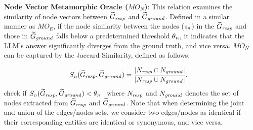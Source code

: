 

   
\textbf{Node Vector Metamorphic Oracle ($MO_N$)}: This relation examines the similarity of node vectors between $\widetilde{G}_{\mathit{resp}}$ and $\widetilde{G}_{\mathit{ground}}$. 
Defined in a similar manner as $MO_E$, if the node similarity between the nodes ($\mathit{s}_{\mathit{n}}$) in the $\widetilde{G}_{\mathit{resp}}$ and those in $\widetilde{G}_{\mathit{ground}}$ falls below a predetermined threshold $\theta_{\mathit{n}}$, it indicates that the LLM's answer significantly diverges from the ground truth, and vice versa.
$MO_N$ can be captured by the Jaccard Similarity, defined as follows:

$$S_{\mathit{n}}(\widetilde{G}_{\mathit{resp}}, \widetilde{G}_{\mathit{ground}}) = \frac{|N_{\mathit{resp}} \cap N_{\mathit{ground}}|}{|N_{\mathit{resp}} \cup N_{\mathit{ground}}|}, $$check if $
S_{\mathit{n}}(\widetilde{G}_{\mathit{resp}}, \widetilde{G}_{\mathit{ground}})  < \theta_{\mathit{n}}  
$~
where $N_{\mathit{resp}}$ and $N_{\mathit{ground}}$ denotes the set of nodes extracted from $\widetilde{G}_{\mathit{resp}}$ and $\widetilde{G}_{\mathit{ground}}$.
Note that when determining the joint and union of the edges/nodes sets, we consider two edges/nodes as identical if their corresponding entities are identical or synonymous, and vice versa.


